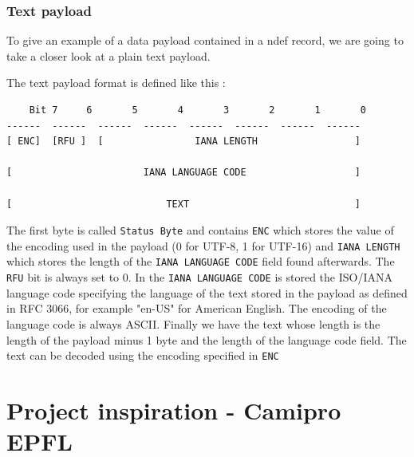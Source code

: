 \documentclass[twoside, openright,11pt,a4paper]{book}
\begin{document}
\subsubsection{Text payload}
To give an example of a data payload contained in a \gls{ndef} record, we are going to take a closer look at a plain text payload.

The text payload format is defined like this\cite{nfc:ndef:doc:text_record} :
\begin{verbatim}
	Bit 7     6       5       4       3       2       1       0
------  ------  ------  ------  ------  ------  ------  ------ 
[ ENC]  [RFU ]  [                IANA LENGTH                 ]  

[                       IANA LANGUAGE CODE                   ]

[                           TEXT                             ]
\end{verbatim}
The first byte is called \verb+Status Byte+ and contains \verb+ENC+ which stores the value of the encoding used in the payload (0 for UTF-8, 1 for UTF-16) and \verb+IANA LENGTH+ which stores the length of the \verb+IANA LANGUAGE CODE+ field found afterwards. The \verb+RFU+ bit is always set to 0. In the \verb+IANA LANGUAGE CODE+ is stored the ISO/IANA language code specifying the language of the text stored in the payload as defined in RFC 3066\cite{rfc:language}, for example "en-US" for American English. The encoding of the language code is always ASCII. Finally we have the text whose length is the length of the payload minus 1 byte and the length of the language code field. The text can be decoded using the encoding specified in \verb+ENC+

\section{Project inspiration - Camipro EPFL}
\end{document}
